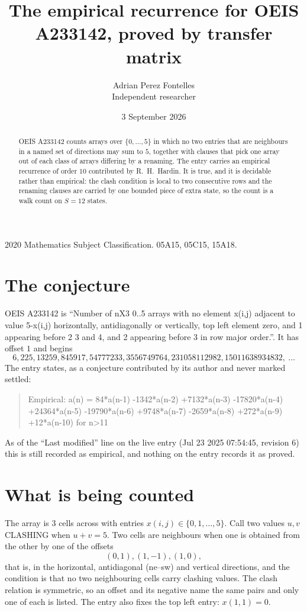 \documentclass[11pt,a4paper]{article}
\title{The empirical recurrence for OEIS A233142, proved by transfer matrix}
\author{Adrian Perez Fontelles\\ \small Independent researcher}
\date{3 September 2026}
\theoremstyle{plain}
\theoremstyle{definition}
\begin{document}
\maketitle

\begin{abstract}
OEIS A233142 counts arrays over $\{0,\dots,5\}$ in which no two entries that are neighbours in
a named set of directions may sum to $5$, together with clauses that pick one array out of
each class of arrays differing by a renaming. The entry carries an empirical recurrence of
order $10$ contributed by R.~H.~Hardin. It is true, and it is decidable rather than
empirical: the clash condition is local to two consecutive rows and the renaming clauses are
carried by one bounded piece of extra state, so the count is a walk count on $S=12$ states.
\end{abstract}

\noindent\small 2020 Mathematics Subject Classification. 05A15, 05C15, 15A18.\normalsize

\section{The conjecture}

OEIS A233142 is ``Number of nX3 0..5 arrays with no element x(i,j) adjacent to value 5-x(i,j) horizontally, antidiagonally or vertically, top left element zero, and 1 appearing before 2 3 and 4, and 2 appearing before 3 in row major order.''. It has offset $1$ and begins
\[
6, 225, 13259, 845917, 54777233, 3556749764, 231058112982, 15011638934832,\ \dots
\]
The entry states, as a conjecture contributed by its author and never marked settled:
\begin{quote}
Empirical: a(n) = 84*a(n-1) -1342*a(n-2) +7132*a(n-3) -17820*a(n-4) +24364*a(n-5) -19790*a(n-6) +9748*a(n-7) -2659*a(n-8) +272*a(n-9) +12*a(n-10) for n>11
\end{quote}
As of the ``Last modified'' line on the live entry (Jul 23 2025 07:54:45, revision 6) this is still
recorded as empirical, and nothing on the entry records it as proved.

\section{What is being counted}

The array is $3$ cells across with entries $x(i,j)\in\{0,1,\dots,5\}$. Call two values $u,v$ CLASHING
when $u+v=5$. Two cells are neighbours when one is obtained from the other by one of
the offsets
\[
(0,1), (1,-1), (1,0),
\]
that is, in the horizontal, antidiagonal (ne--sw) and vertical directions, and the condition is that no two neighbouring cells carry
clashing values. The clash relation is symmetric, so an offset and its negative name the
same pairs and only one of each is listed. The entry also fixes the top left entry: $x(1,1)=0$.
\end{document}
